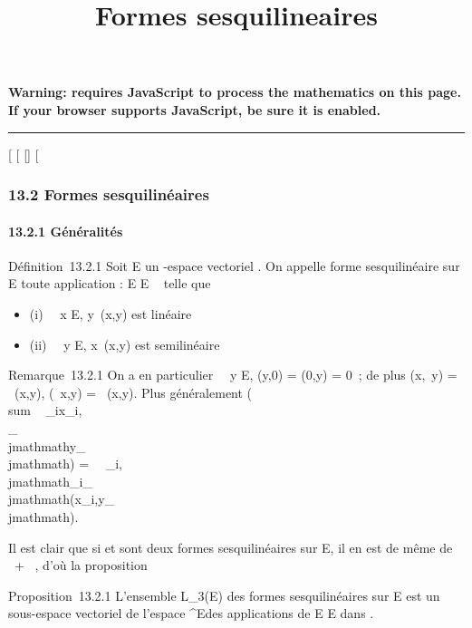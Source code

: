 \documentclass[]{article}
\title{Formes sesquilineaires}
\author{}
\date{}
\begin{document}
\maketitle

\textbf{Warning: 
requires JavaScript to process the mathematics on this page.\\ If your
browser supports JavaScript, be sure it is enabled.}

\begin{center}\rule{3in}{0.4pt}\end{center}

{[}
{[}
{[}{]}
{[}

\subsubsection{13.2 Formes sesquilinéaires}

\paragraph{13.2.1 Généralités}

Définition~13.2.1 Soit E un -espace vectoriel . On appelle forme
sesquilinéaire sur E toute application \phi : E \times E \rightarrow~  telle que

\begin{itemize}
\itemsep1pt\parskip0pt
\item
  (i) \forall~~x \in E,
  y\mapsto~\phi(x,y) est linéaire
\item
  (ii) \forall~~y \in E,
  x\mapsto~\phi(x,y) est semilinéaire
\end{itemize}

Remarque~13.2.1 On a en particulier \forall~~y \in E,
\phi(y,0) = \phi(0,y) = 0~; de plus \phi(x,\lambda~y) = \lambda~\phi(x,y), \phi(\lambda~x,y) =
\overline\lambda~\phi(x,y). Plus généralement
\phi(\\sum ~
\lambda_ix_i,\\\sum
 \mu_\\jmathmathy_\\jmathmath) =\
\sum ~
_i,\\jmathmath\overline\lambda_i\mu_\\jmathmath\phi(x_i,y_\\jmathmath).

Il est clair que si \phi et \psi sont deux formes sesquilinéaires sur E, il en
est de même de \alpha~\phi + \beta~\psi, d'où la proposition

Proposition~13.2.1 L'ensemble L_3(E) des formes
sesquilinéaires sur E est un sous-espace vectoriel de l'espace
^E\timesE des applications de E \times E dans .
\end{document}
